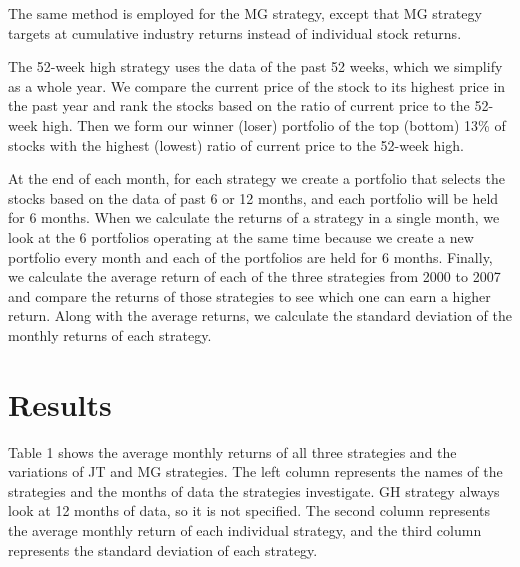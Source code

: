 \documentclass{article}
\begin{document}
The same method is employed for the MG strategy, except that MG strategy targets at cumulative industry returns instead of individual stock returns. 

The 52-week high strategy uses the data of the past 52 weeks, which we simplify as a whole year. We compare the current price of the stock to its highest price in the past year and rank the stocks based on the ratio of current price to the 52-week high. Then we form our winner (loser) portfolio of the top (bottom) 13\% of stocks with the highest (lowest) ratio of current price to the 52-week high. 

At the end of each month, for each strategy we create a portfolio that selects the stocks based on the data of past 6 or 12 months, and each portfolio will be held for 6 months. When we calculate the returns of a strategy in a single month, we look at the 6 portfolios operating at the same time because we create a new portfolio every month and each of the portfolios are held for 6 months. Finally, we calculate the average return of each of the three strategies from 2000 to 2007 and compare the returns of those strategies to see which one can earn a higher return. Along with the average returns, we calculate the standard deviation of the monthly returns of each strategy. 

\pagebreak

\section{Results}


Table 1 shows the average monthly returns of all three strategies and the variations of JT and MG strategies. The left column represents the names of the strategies and the months of data the strategies investigate. GH strategy always look at 12 months of data, so it is not specified. The second column represents the average monthly return of each individual strategy, and the third column represents the standard deviation of each strategy.
\end{document}
